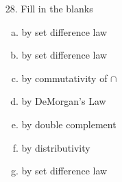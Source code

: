 \documentclass[12pt]{article}
\begin{document}
\begin{enumerate}
\begin{enumerate}
            \item[28.] Fill in the blanks
                \begin{enumerate}[(a)]
                    \item by set difference law
                    \item by set difference law
                    \item by commutativity of $\cap$
                    \item by DeMorgan's Law
                    \item by double complement
                    \item by distributivity
                    \item by set difference law
                \end{enumerate}
    \end{enumerate}


\end{enumerate}
\end{document}

